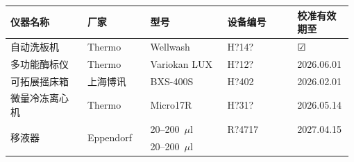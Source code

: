\documentclass[UTF8,10pt,a4paper,fontset=fandol]{ctexart}
\newcommand{\fieldvalue}[1]{#1}
\newcommand{\handwritten}[1]{#1}
\newcommand{\checkboxfield}[1]{\ifstrequal{#1}{checked}{☑}{\ifstrequal{#1}{unclear}{?}{☐}}}
\begin{document}
\begin{center}
\small
\begin{tabular}{|p{0.22\linewidth}|p{0.18\linewidth}|p{0.22\linewidth}|p{0.20\linewidth}|p{0.16\linewidth}|}
\hline
仪器名称 & 厂家 & 型号 & 设备编号 & 校准有效期至\\
\hline
自动洗板机 & Thermo & Wellwash &
\fieldvalue{\handwritten{H?14?}} &
\fieldvalue{\checkboxfield{checked}}\\
\hline
多功能酶标仪 & Thermo & Variokan LUX &
\fieldvalue{\handwritten{H?12?}} &
\fieldvalue{\handwritten{2026.06.01}}\\
\hline
可拓展摇床箱 & 上海博讯 & BXS-400S &
\fieldvalue{\handwritten{H?402}} &
\fieldvalue{\handwritten{2026.02.01}}\\
\hline
微量冷冻离心机 & Thermo & Micro17R &
\fieldvalue{\handwritten{H?31?}} &
\fieldvalue{\handwritten{2026.05.14}}\\
\hline
\multirow{4}{*}{移液器} & \multirow{4}{*}{Eppendorf} &
\fieldvalue{\handwritten{20--200~$\mu$l}} &
\fieldvalue{\handwritten{R?4717}} &
\fieldvalue{\handwritten{2027.04.15}}\\
\cline{3-5}
& &
\fieldvalue{\handwritten{20--200~$\mu$l}} &

\end{tabular}
\end{center}
\end{document}
